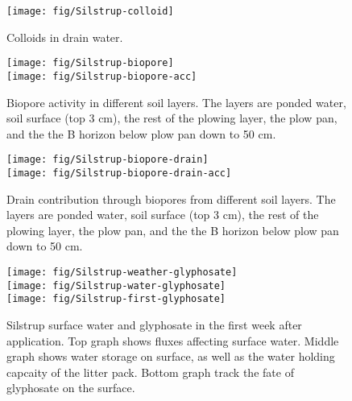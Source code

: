 \begin{figure}[htbp]
  \begin{center}
    \texttt{[image: fig/Silstrup-colloid]}
  \end{center}
  \caption{Colloids in drain water.}
  \label{fig:Silstrup-colloids}
\end{figure}\FloatBarrier

\begin{figure}[htbp]
  \begin{center}
    \texttt{[image: fig/Silstrup-biopore]}\\
    \texttt{[image: fig/Silstrup-biopore-acc]}\\
  \end{center}
  \caption{Biopore activity in different soil layers.  The layers are
    ponded water, soil surface (top 3 cm), the rest of the plowing layer,
    the plow pan, and the the B horizon below plow pan down to 50 cm.}
  \label{fig:Silstrup-biopore}
\end{figure}\FloatBarrier

\begin{figure}[htbp]
  \begin{center}
    \texttt{[image: fig/Silstrup-biopore-drain]}\\
    \texttt{[image: fig/Silstrup-biopore-drain-acc]}
  \end{center}
  \caption{Drain contribution through biopores from different soil
    layers.  The layers are ponded water, soil surface (top 3 cm), the
    rest of the plowing layer, the plow pan, and the the B horizon
    below plow pan down to 50 cm.}
  \label{fig:Silstrup-biopore-drain}
\end{figure}\FloatBarrier

\begin{figure}[htbp]
  \begin{center}
    \texttt{[image: fig/Silstrup-weather-glyphosate]}\\
    \texttt{[image: fig/Silstrup-water-glyphosate]}\\
    \texttt{[image: fig/Silstrup-first-glyphosate]}
  \end{center}
  \caption{Silstrup surface water and glyphosate in the first week
    after application.  Top graph shows fluxes affecting surface
    water.  Middle graph shows water storage on surface, as well as
    the water holding capcaity of the litter pack.  Bottom graph track
    the fate of glyphosate on the surface.}
  \label{fig:Silstrup-weather-glyphosate}
\end{figure}\FloatBarrier

